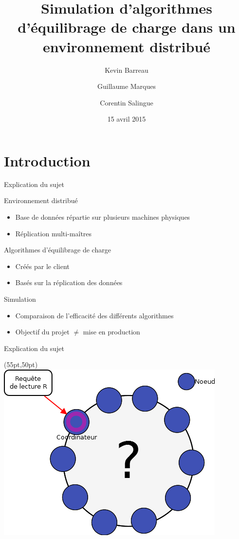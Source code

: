 \documentclass{beamer}
\title[Projet de Programmation]{Simulation d'algorithmes \\d'équilibrage de charge dans un \\environnement distribué}
\author{Kevin Barreau \and Guillaume Marques \and Corentin Salingue}
\institute{Université de Bordeaux}
\date{15 avril 2015}
\begin{document}
\mode* %



%
\begin{frame}
\titlepage
\end{frame}


\section{Introduction}

\begin{frame}{Explication du sujet}
\begin{block}{Environnement distribué}
\begin{itemize}
	\item Base de données répartie sur plusieurs machines physiques
	\item Réplication multi-maîtres
\end{itemize}
\end{block}
\begin{block}{Algorithmes d'équilibrage de charge}
\begin{itemize}
	\item Créés par le client
	\item Basés sur la réplication des données
\end{itemize}
\end{block}
\begin{block}{Simulation}
\begin{itemize}
	\item Comparaison de l'efficacité des différents algorithmes
	\item Objectif du projet $\neq$ mise en production
\end{itemize}
\end{block}
\end{frame}

\begin{frame}{Explication du sujet}
\begin{textblock*}{\paperwidth}(55pt,50pt)
    \includegraphics[scale=0.5]{read_request_interrogation}
\end{textblock*}
\end{frame}
\end{document}
